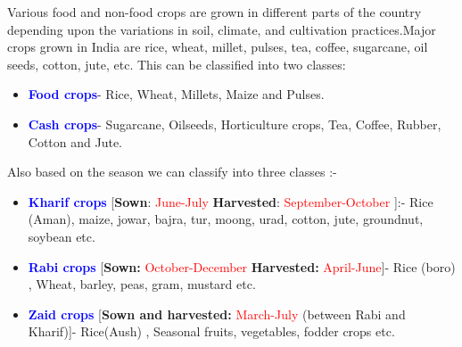 Various food and non-food crops are grown in different parts of the country depending upon the variations in soil, climate, and cultivation practices.Major crops grown in India are rice, wheat, millet, pulses, tea, coffee, sugarcane, oil seeds, cotton, jute, etc. This can be classified into two classes:
\begin{itemize}
    \item \textbf{\textcolor{blue}{Food crops}}- Rice, Wheat, Millets, Maize and Pulses.
    \item \textbf{\textcolor{blue}{Cash crops}}- Sugarcane, Oilseeds, Horticulture crops, Tea, Coffee, Rubber, Cotton and Jute.
\end{itemize}
Also based on the season we can classify into three classes :- 

\begin{itemize}
    \item \textbf{\textcolor{blue}{Kharif crops}} [\textbf{Sown}: \textcolor{red}{June-July}
\textbf{Harvested}: \textcolor{red}{September-October} ]:- Rice (Aman), maize, jowar, bajra, tur, moong, urad, cotton, jute, groundnut, soybean etc.
\item \textbf{\textcolor{blue}{Rabi crops}} [\textbf{Sown:} \textcolor{red}{October-December}
\textbf{Harvested:} \textcolor{red}{April-June}]- Rice (boro) , Wheat, barley, peas, gram, mustard etc.
\item \textbf{\textcolor{blue}{Zaid crops}} [\textbf{Sown and harvested:} \textcolor{red}{March-July}
(between Rabi and Kharif)]- Rice(Aush) , Seasonal fruits, vegetables, fodder crops etc.
\end{itemize}
